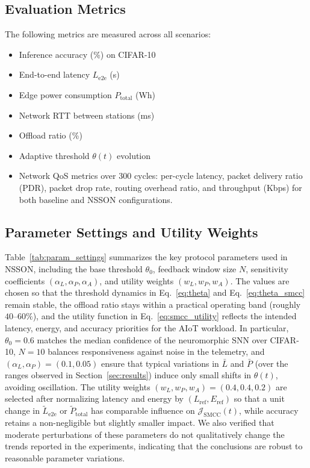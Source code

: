 \documentclass[journal]{IEEEtran}
\newcommand{\revblue}[1]{\textcolor{revblue}{#1}}
\begin{document}
\subsection{Evaluation Metrics}

The following metrics are measured across all scenarios:
\begin{itemize}
\item Inference accuracy (\%) on CIFAR-10
\item End-to-end latency $L_{\text{e2e}}$ (s)
\item Edge power consumption $P_{\text{total}}$ (Wh)
\item Network RTT between stations (ms)
\item Offload ratio (\%)
\item Adaptive threshold $\theta(t)$ evolution
\item Network QoS metrics over 300 cycles: per-cycle latency, packet delivery ratio (PDR), packet drop rate, routing overhead ratio, and throughput (Kbps) for both baseline and NSSON configurations.
\end{itemize}
\subsection{\revblue{Parameter Settings and Utility Weights}}

\revblue{Table~\ref{tab:param_settings} summarizes the key protocol
parameters used in NSSON, including the base threshold $\theta_0$,
feedback window size $N$, sensitivity coefficients
$(\alpha_L,\alpha_P,\alpha_A)$, and utility weights $(w_L,w_P,w_A)$.
The values are chosen so that the threshold dynamics in Eq.~\eqref{eq:theta} and Eq.~\eqref{eq:theta_smcc} remain stable, the offload
ratio stays within a practical operating band (roughly $40$--$60\%$),
and the utility function in Eq.~\eqref{eq:smcc_utility} reflects the
intended latency, energy, and accuracy priorities for the AIoT workload. In
particular, $\theta_0=0.6$ matches the median confidence of the
neuromorphic SNN over CIFAR-10, $N=10$ balances responsiveness against
noise in the telemetry, and $(\alpha_L,\alpha_P)=(0.1,0.05)$ ensure that
typical variations in $\bar{L}$ and $\bar{P}$ (over the ranges observed
in Section~\ref{sec:results}) induce only small shifts in $\theta(t)$,
avoiding oscillation. The utility weights $(w_L,w_P,w_A)=(0.4,0.4,0.2)$
are selected after normalizing latency and energy by
$(L_{\text{ref}},E_{\text{ref}})$ so that a unit change in
$\tilde{L}_{\text{e2e}}$ or $\tilde{P}_{\text{total}}$ has comparable
influence on $\mathcal{J}_{\mathrm{SMCC}}(t)$, while accuracy retains a
non-negligible but slightly smaller impact. We also verified that
moderate perturbations of these parameters do not qualitatively change the trends reported in the experiments, indicating that the conclusions
are robust to reasonable parameter variations.}
\end{document}

